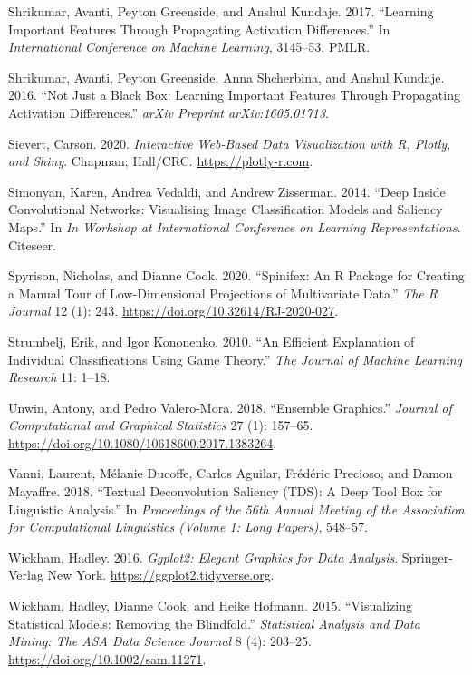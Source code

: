 \documentclass[
]{article}
\newlength{\cslhangindent}
\newlength{\cslentryspacingunit} %
\newenvironment{CSLReferences}[2] %
 {%
  \setlength{\parindent}{0pt}
  \ifodd #1
  \let\oldpar\par
  \def\par{\hangindent=\cslhangindent\oldpar}
  \fi
  \setlength{\parskip}{#2\cslentryspacingunit}
 }%
 {}
\begin{document}
\begin{CSLReferences}{1}{0}
\leavevmode{}%
Shrikumar, Avanti, Peyton Greenside, and Anshul Kundaje. 2017. {``Learning Important Features Through Propagating Activation Differences.''} In \emph{International {Conference} on {Machine} {Learning}}, 3145--53. PMLR.

\leavevmode{}%
Shrikumar, Avanti, Peyton Greenside, Anna Shcherbina, and Anshul Kundaje. 2016. {``Not Just a Black Box: {Learning} Important Features Through Propagating Activation Differences.''} \emph{arXiv Preprint arXiv:1605.01713}.

\leavevmode{}%
Sievert, Carson. 2020. \emph{Interactive {Web}-{Based} {Data} {Visualization} with {R}, Plotly, and Shiny}. Chapman; Hall/CRC. \url{https://plotly-r.com}.

\leavevmode{}%
Simonyan, Karen, Andrea Vedaldi, and Andrew Zisserman. 2014. {``Deep Inside Convolutional Networks: {Visualising} Image Classification Models and Saliency Maps.''} In \emph{In {Workshop} at {International} {Conference} on {Learning} {Representations}}. Citeseer.

\leavevmode{}%
Spyrison, Nicholas, and Dianne Cook. 2020. {``Spinifex: An {R} {Package} for {Creating} a {Manual} {Tour} of {Low}-Dimensional {Projections} of {Multivariate} {Data}.''} \emph{The R Journal} 12 (1): 243. \url{https://doi.org/10.32614/RJ-2020-027}.

\leavevmode{}%
Strumbelj, Erik, and Igor Kononenko. 2010. {``An Efficient Explanation of Individual Classifications Using Game Theory.''} \emph{The Journal of Machine Learning Research} 11: 1--18.

\leavevmode{}%
Unwin, Antony, and Pedro Valero-Mora. 2018. {``Ensemble Graphics.''} \emph{Journal of Computational and Graphical Statistics} 27 (1): 157--65. \url{https://doi.org/10.1080/10618600.2017.1383264}.

\leavevmode{}%
Vanni, Laurent, Mélanie Ducoffe, Carlos Aguilar, Frédéric Precioso, and Damon Mayaffre. 2018. {``Textual {Deconvolution} {Saliency} ({TDS}): A Deep Tool Box for Linguistic Analysis.''} In \emph{Proceedings of the 56th {Annual} {Meeting} of the {Association} for {Computational} {Linguistics} ({Volume} 1: {Long} {Papers})}, 548--57.

\leavevmode{}%
Wickham, Hadley. 2016. \emph{Ggplot2: {Elegant} {Graphics} for {Data} {Analysis}}. Springer-Verlag New York. \url{https://ggplot2.tidyverse.org}.

\leavevmode{}%
Wickham, Hadley, Dianne Cook, and Heike Hofmann. 2015. {``Visualizing Statistical Models: {Removing} the Blindfold.''} \emph{Statistical Analysis and Data Mining: The ASA Data Science Journal} 8 (4): 203--25. \url{https://doi.org/10.1002/sam.11271}.

\end{CSLReferences}
\end{document}
